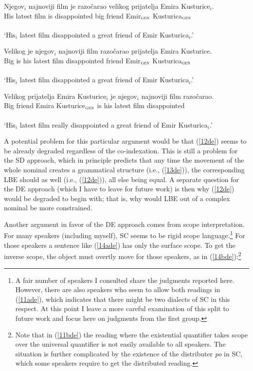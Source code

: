\documentclass[
    output=paper,
    colorlinks,
    citecolor=brown,
]{langscibook}
\begin{document}
\begin{exe}
\ex \label{11de}
\gll *Njegov$_{i}$  najnoviji film je  razočarao      velikog prijatelja Emira Kusturice$_{i}$.\\
His latest film is disappointed big friend Emir$_{\textsc{gen}}$ Kusturica$_{\textsc{gen}}$\\\\
‘His$_{i}$ latest film disappointed a great friend of Emir Kusturica$_{i}$.’

\ex \label{12de}
\gll *Velikog je njegov$_{i}$ najnoviji film  razočarao prijatelja Emira Kusturice.\\
Big is his latest film disappointed friend Emir$_{\textsc{gen}}$ Kusturica$_{\textsc{gen}}$\\\\
‘His$_{i}$ latest film disappointed a great friend of Emir Kusturica$_{i}$.’


\ex \label{13de}
\gll Velikog prijatelja Emira Kusturice$_{i}$ je njegov$_{i}$  najnoviji film razočarao.\\
Big friend Emira Kusturice$_{\textsc{gen}}$ is his latest film disappointed\\\\
‘His$_{i}$ latest film really disappointed a great friend of Emir Kusturica$_{i}$.’

\end{exe}

A potential problem for this particular argument would be that (\ref{12de}) seems to be already degraded regardless of the co-indexation. This is still a problem for the SD approach, which in principle predicts that any time the movement of the whole nominal creates a grammatical structure (i.e., (\ref{13de})), the corresponding LBE should as well (i.e., (\ref{12de})), all else being equal. A separate question for the DE approach (which I have to leave for future work) is then why (\ref{12de}) would be degraded to begin with; that is, why would LBE out of a complex nominal be more constrained.

Another argument in favor of the DE approach comes from scope interpretation. For many speakers (including myself), SC seems to be rigid scope language.\footnote{A fair number of speakers I consulted share the judgments reported here. However, there are also speakers who seem to allow both readings in (\ref{11ade}), which indicates that there might be two dialects of SC in this respect. At this point I leave a more careful examination of this split to future work and focus here on judgments from the first group.} For those speakers a sentence like (\ref{14ade}) has only the surface scope. To get the inverse scope, the object must overtly move for those speakers, as in (\ref{14bde}):\footnote{Note that in (\ref{11bde}) the reading where the existential quantifier takes scope over the universal quantifier is not easily available to all speakers. The situation is further complicated by the existence of the distributer \textit{po} in SC, which some speakers require to get the distributed reading.} 
\end{document}
